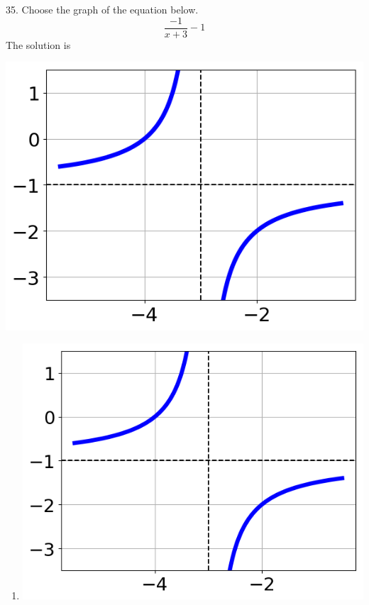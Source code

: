 \documentclass{article}[10pt]
\begin{document}
35. Choose the graph of the equation below.
$$ \frac{-1}{x + 3} - 1 $$ 
The solution is  
\begin{center}\includegraphics[scale=0.5]{../Figures/question35AB.png}\end{center}\begin{enumerate}[label=\Alph*.] 
\item  
\begin{center}\includegraphics[scale=0.5]{../Figures/question35AB.png}\end{center} 
 

\end{enumerate}
\end{document}
